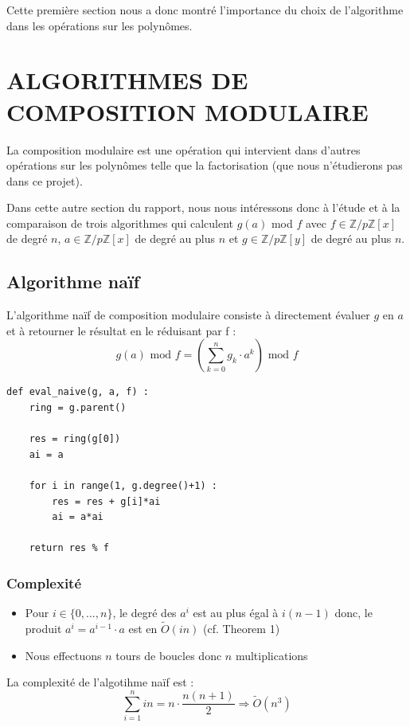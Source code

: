 \documentclass[a4paper]{article}
\begin{document}
Cette première section nous a donc montré l'importance du choix de l'algorithme dans les opérations sur les polynômes.

\newpage

\section{ALGORITHMES DE COMPOSITION MODULAIRE}

La composition modulaire est une opération qui intervient dans d'autres opérations sur les polynômes telle que la factorisation (que nous n'étudierons pas dans ce projet).

Dans cette autre section du rapport, nous nous intéressons donc à l'étude et à la comparaison de trois algorithmes qui calculent $g(a)$ mod $f$ avec 
$f \in \mathbb{Z}/p\mathbb{Z}[x]$ de degré $n$, $a \in \mathbb{Z}/p\mathbb{Z}[x]$ de degré au plus $n$ et $g \in \mathbb{Z}/p\mathbb{Z}[y]$ de degré au plus $n$.



\subsection{Algorithme naïf}

L'algorithme naïf de composition modulaire consiste à directement évaluer $g$ en $a$ et à retourner le résultat en le réduisant par f :
\[
g(a)\text{ mod }f = \left(\sum_{k=0}^n g_k \cdot a^k\right) \text{ mod }f    
\]

\begin{lstlisting}[title={naive}]
def eval_naive(g, a, f) :
	ring = g.parent()

	res = ring(g[0])
	ai = a
	
    for i in range(1, g.degree()+1) :
		res = res + g[i]*ai
		ai = a*ai

	return res % f
\end{lstlisting}

\subsubsection*{Complexité}
\begin{itemize}
    \item Pour $i \in \{0,...,n\}$, le degré des $a^i$ est au plus égal à $i(n-1)$ donc, le produit $a^i=a^{i-1}\cdot a$ est en $\tilde{O}(in)$ (cf. Theorem 1)
    \item Nous effectuons $n$ tours de boucles donc $n$ multiplications
\end{itemize}
La complexité de l'algotihme naïf est :
\[
\sum_{i=1}^{n}in=n \cdot \dfrac{n(n+1)}{2} \Longrightarrow \tilde{O}(n^3)
\]
\end{document}
